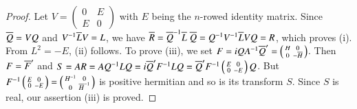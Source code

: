 \begin{proof}
Let $V= \left(\begin{smallmatrix} 0 & E \\ E &
 0 \end{smallmatrix} \right)$ with $E$ being the $n$-rowed identity
matrix. Since $\overline{Q}=VQ$ and $V^{-1}\overline{L} V = L$, we have
$\overline{R}=\overline{Q}^{-1} \overline{L} \; \overline{Q}=Q^{-1} V^{-1} \overline{L}VQ=R$, which
proves (i). From $L^2=-E$, (ii) follows. To prove (iii), we set $F=i Q
A^{-1} \overline{Q}'= \left(\begin{smallmatrix} H & 0 \\ 0 &
 -\overline{H} \end{smallmatrix} \right)$. Then $F=\overline{F}'$ and $S=A R = A
Q^{-1} L Q = i \overline{Q}' F^{-1} L Q = \overline{Q}' F^{-1}
\left(\begin{smallmatrix} E & 0 \\ 0 & -E \end{smallmatrix}
\right) Q$. But $F^{-1} \left(\begin{smallmatrix} E & 0 \\ 0 &
 -E \end{smallmatrix} \right) = \left(\begin{smallmatrix} H^{-1} & 0 \\ 0 &
 \overline{H}^{-1} \end{smallmatrix} \right)$ is positive hermitian and so
is its transform $S$. Since $S$ is real, our assertion (iii) is
proved.


\end{proof}
